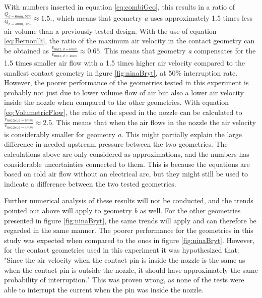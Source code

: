\documentclass[10pt,a4paper,twoside]{article}
\begin{document}
With numbers inserted in equation \eqref{eq:combiGeo}, this results in a ratio of $\frac{Q_{d=6 mm, 50\%}}{Q_{d=4 mm, 50\%}}\approx 1.5$., which means that geometry \textit{a} uses approximately 1.5 times less air volume than a previously tested design. With the use of equation \eqref{eq:Bernoulli}, the ratio of the maximum air velocity in the contact geometry can be obtained as $\frac{v_{max, d=6 mm}}{v_{max, d=4 mm}}\approx 0.65$. This means that geometry \textit{a} compensates for the 1.5 times smaller air flow with a 1.5 times higher air velocity compared to the smallest contact geometry in figure \ref{fig:ninaBryt}, at 50\% interruption rate. However, the poorer performance of the geometries tested in this experiment is probably not just due to lower volume flow of air but also a lower air velocity inside the nozzle when compared to the other geometries. With equation \eqref{eq:VolumetricFlow}, the ratio of the speed in the nozzle can be calculated to $\frac{v_{nozzle, d=6 mm}}{v_{nozzle, d=4 mm}}\approx 2.5$. This means that when the air flows in the nozzle the air velocity is considerably smaller for geometry \textit{a}. This might partially explain the large difference in needed upstream pressure between the two geometries. The calculations above are only considered as approximations, and the numbers has considerable uncertainties connected to them. This is because the equations are based on cold air flow without an electrical arc, but they might still be used to indicate a difference between the two tested geometries.

Further numerical analysis of these results will not be conducted, and the trends pointed out above will apply to geometry \textit{b} as well. For the other geometries presented in figure \ref{fig:ninaBryt}, the same trends will apply and can therefore be regarded in the same manner. The poorer performance for the geometries in this study was expected when compared to the ones in figure \ref{fig:ninaBryt}. However, for the contact geometries used in this experiment it was hypothesized that: "Since the air velocity when the contact pin is inside the nozzle is the same as when the contact pin is outside the nozzle, it should have approximately the same probability of interruption." This was proven wrong, as none of the tests were able to interrupt the current when the pin was inside the nozzle.
\end{document}
